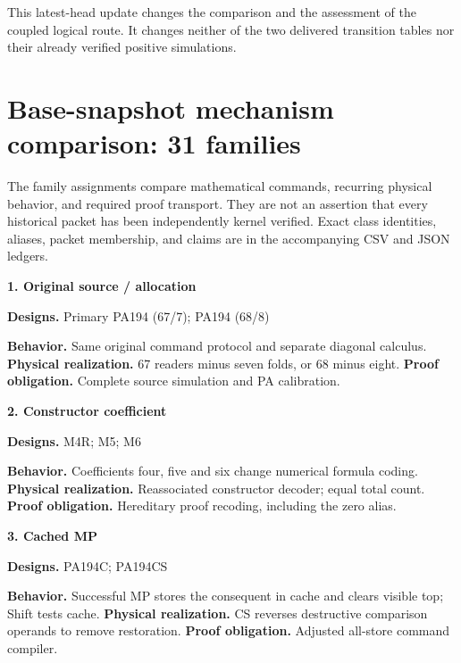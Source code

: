 \documentclass[10pt,a4paper]{article}
\begin{document}
This latest-head update changes the comparison and the assessment of the coupled logical route. It changes neither of the two delivered transition tables nor their already verified positive simulations.
\clearpage\appendix
\section{Base-snapshot mechanism comparison: 31 families}
The family assignments compare mathematical commands, recurring physical behavior, and required proof transport. They are not an assertion that every historical packet has been independently kernel verified. Exact class identities, aliases, packet membership, and claims are in the accompanying CSV and JSON ledgers.
\par\medskip\begin{samepage}\noindent\textbf{1. Original source / allocation}\par\nobreak
\textbf{Designs.} Primary PA194\allowbreak{} (67/7);\allowbreak{} PA194\allowbreak{} (68/8)

\textbf{Behavior.} Same original command protocol and separate diagonal calculus. \textbf{Physical realization.} 67 readers minus seven folds, or 68 minus eight. \textbf{Proof obligation.} Complete source simulation and PA calibration.
\end{samepage}

\par\medskip\begin{samepage}\noindent\textbf{2. Constructor coefficient}\par\nobreak
\textbf{Designs.} M4R;\allowbreak{} M5;\allowbreak{} M6

\textbf{Behavior.} Coefficients four, five and six change numerical formula coding. \textbf{Physical realization.} Reassociated constructor decoder; equal total count. \textbf{Proof obligation.} Hereditary proof recoding, including the zero alias.
\end{samepage}

\par\medskip\begin{samepage}\noindent\textbf{3. Cached MP}\par\nobreak
\textbf{Designs.} PA194\allowbreak{}C;\allowbreak{} PA194\allowbreak{}CS

\textbf{Behavior.} Successful MP stores the consequent in cache and clears visible top; Shift tests cache. \textbf{Physical realization.} CS reverses destructive comparison operands to remove restoration. \textbf{Proof obligation.} Adjusted all-store command compiler.
\end{samepage}
\end{document}
